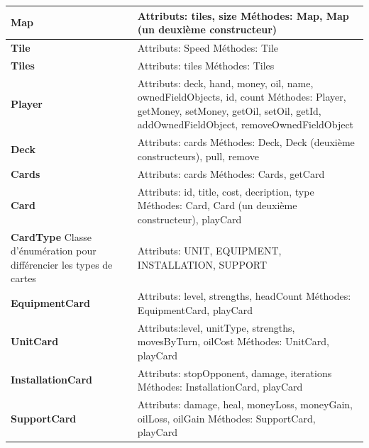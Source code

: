\begin{tabularx}{15 cm}{|X|X|}
\hline
\textbf{Map} & Attributs: tiles, size  \newline Méthodes: Map, Map (un deuxième constructeur)\\
\hline
\textbf{Tile} & Attributs: Speed  \newline Méthodes: Tile\\
\hline
\textbf{Tiles} & Attributs: tiles  \newline Méthodes: Tiles\\

\hline
\textbf{Player} & Attributs: deck, hand, money, oil, name, ownedFieldObjects, id, count  \newline Méthodes: Player, getMoney, setMoney, getOil, setOil, getId, addOwnedFieldObject, removeOwnedFieldObject\\
\hline
\textbf{Deck} & Attributs: cards  \newline Méthodes: Deck, Deck (deuxième constructeurs), pull, remove\\
\hline
\textbf{Cards} & Attributs: cards  \newline Méthodes: Cards, getCard\\
\hline
\textbf{Card} & Attributs: id, title, cost, decription, type  \newline Méthodes: Card, Card (un deuxième constructeur), playCard\\
\hline
\textbf{CardType} \newline Classe d'énumération pour différencier les types de cartes & Attributs: UNIT, EQUIPMENT, INSTALLATION, SUPPORT  \newline \\
\hline
\textbf{EquipmentCard} & Attributs: level, strengths, headCount  \newline Méthodes: EquipmentCard, playCard\\
\hline
\textbf{UnitCard} & Attributs:level, unitType, strengths, movesByTurn, oilCost  \newline Méthodes: UnitCard, playCard\\
\hline
\textbf{InstallationCard} & Attributs: stopOpponent, damage, iterations \newline Méthodes: InstallationCard, playCard\\
\hline
\textbf{SupportCard} & Attributs: damage, heal, moneyLoss, moneyGain, oilLoss, oilGain  \newline Méthodes: SupportCard, playCard\\
\hline
\end{tabularx}

